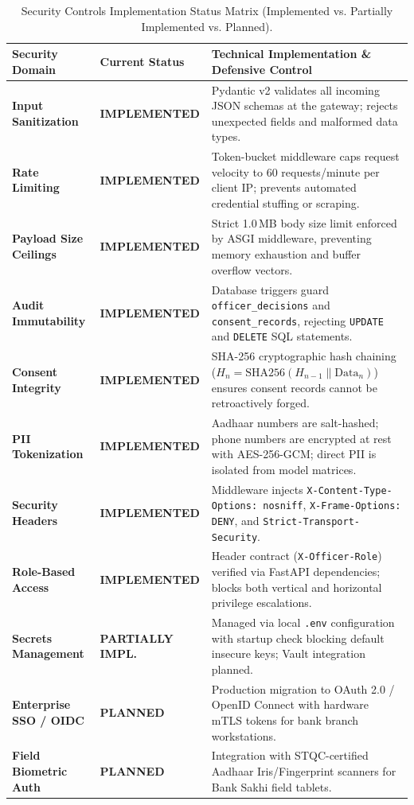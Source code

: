 \begin{table}[H]
\centering
\small
\renewcommand{\arraystretch}{1.2}
\begin{tabularx}{\textwidth}{p{3.2cm} p{3.2cm} X}
  \toprule
  \textbf{Security Domain} & \textbf{Current Status} & \textbf{Technical Implementation \& Defensive Control} \\
  \midrule
  \textbf{Input Sanitization} & \textbf{IMPLEMENTED} & Pydantic v2 validates all incoming JSON schemas at the gateway; rejects unexpected fields and malformed data types. \\
  \addlinespace
  \textbf{Rate Limiting} & \textbf{IMPLEMENTED} & Token-bucket middleware caps request velocity to 60 requests/minute per client IP; prevents automated credential stuffing or scraping. \\
  \addlinespace
  \textbf{Payload Size Ceilings} & \textbf{IMPLEMENTED} & Strict 1.0\,MB body size limit enforced by ASGI middleware, preventing memory exhaustion and buffer overflow vectors. \\
  \addlinespace
  \textbf{Audit Immutability} & \textbf{IMPLEMENTED} & Database triggers guard \texttt{officer\_decisions} and \texttt{consent\_records}, rejecting \texttt{UPDATE} and \texttt{DELETE} SQL statements. \\
  \addlinespace
  \textbf{Consent Integrity} & \textbf{IMPLEMENTED} & SHA-256 cryptographic hash chaining ($H_n = \text{SHA256}(H_{n-1} \parallel \text{Data}_n)$) ensures consent records cannot be retroactively forged. \\
  \addlinespace
  \textbf{PII Tokenization} & \textbf{IMPLEMENTED} & Aadhaar numbers are salt-hashed; phone numbers are encrypted at rest with AES-256-GCM; direct PII is isolated from model matrices. \\
  \addlinespace
  \textbf{Security Headers} & \textbf{IMPLEMENTED} & Middleware injects \texttt{X-Content-Type-Options: nosniff}, \texttt{X-Frame-Options: DENY}, and \texttt{Strict-Transport-Security}. \\
  \addlinespace
  \textbf{Role-Based Access} & \textbf{IMPLEMENTED} & Header contract (\texttt{X-Officer-Role}) verified via FastAPI dependencies; blocks both vertical and horizontal privilege escalations. \\
  \addlinespace
  \textbf{Secrets Management} & \textbf{PARTIALLY IMPL.} & Managed via local \texttt{.env} configuration with startup check blocking default insecure keys; Vault integration planned. \\
  \addlinespace
  \textbf{Enterprise SSO / OIDC} & \textbf{PLANNED} & Production migration to OAuth 2.0 / OpenID Connect with hardware mTLS tokens for bank branch workstations. \\
  \addlinespace
  \textbf{Field Biometric Auth} & \textbf{PLANNED} & Integration with STQC-certified Aadhaar Iris/Fingerprint scanners for Bank Sakhi field tablets. \\
  \bottomrule
\end{tabularx}
\caption{Security Controls Implementation Status Matrix (Implemented vs. Partially Implemented vs. Planned).}
\label{tab:security_controls_status}
\end{table}

